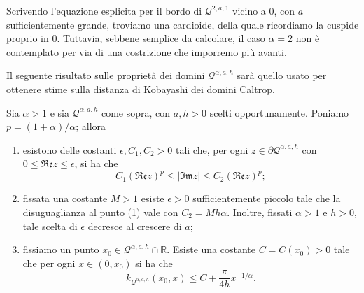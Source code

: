 \begin{oss}
    Scrivendo l'equazione esplicita per il bordo di $\mathcal{Q}^{2,a,1}$ vicino a $0$, con $a$ sufficientemente grande, troviamo una cardioide, della quale ricordiamo la cuspide proprio in $0$. Tuttavia, sebbene semplice da calcolare, il caso $\alpha=2$ non è contemplato per via di una costrizione che imporremo più avanti.
\end{oss}

Il seguente risultato sulle proprietà dei domini $\mathcal{Q}^{\alpha,a,h}$ sarà quello usato per ottenere stime sulla distanza di Kobayashi dei domini Caltrop.

\begin{prop} \label{qaah_biolo}
    Sia $\alpha>1$ e sia $\mathcal{Q}^{\alpha,a,h}$ come sopra, con $a,h>0$ scelti opportunamente. Poniamo $p=(1+\alpha)/\alpha$; allora
    \begin{enumerate}[label={(\arabic*)}]
        \item esistono delle costanti $\epsilon,C_1,C_2>0$ tali che, per ogni $z\in\partial\mathcal{Q}^{\alpha,a,h}$ con $0\le\mathfrak{Re}z\le\epsilon$, si ha che
        $$C_1(\mathfrak{Re}z)^p \le |\mathfrak{Im}z| \le C_2(\mathfrak{Re}z)^p;$$
        \item fissata una costante $M>1$ esiste $\epsilon>0$ sufficientemente piccolo tale che la disuguaglianza al punto (1) vale con $C_2=Mh\alpha$. Inoltre, fissati $\alpha>1$ e $h>0$, tale scelta di $\epsilon$ decresce al crescere di $a$;
        \item fissiamo un punto $x_0\in\mathcal{Q}^{\alpha,a,h}\cap\mathbb{R}$. Esiste una costante $C=C(x_0)>0$ tale che per ogni $x\in(0,x_0)$ si ha che
        $$k_{\mathcal{Q}^{\alpha,a,h}}(x_0,x) \le C+\frac{\pi}{4h}x^{-1/\alpha}.$$
    \end{enumerate}
\end{prop}

